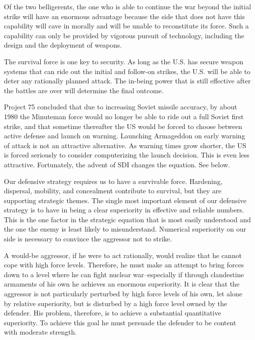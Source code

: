 Of the two belligerents, the one who is able to continue the war beyond the initial strike will have an enormous advantage because the side that does not have this capability will cave in morally and will be unable to reconstitute its force. Such a capability can only be provided by vigorous pursuit of technology, including the design and the deployment of weapons.

The survival force is one key to security. As long as the U.S. has secure weapon systems that can ride out the initial and follow-on strikes, the U.S. will be able to deter any rationally planned attack. The in-being power that is still effective after the battles are over will determine the final outcome.

\begin{mdframed}[backgroundcolor=black!10]
Project 75 concluded that due to increasing Soviet missile accuracy, by about 1980 the Minuteman force would no longer be able to ride out a full Soviet first strike, and that sometime thereafter the US would be forced to choose between active defense and launch on warning. Launching Armageddon on early warning of attack is not an attractive alternative. As warning times grow shorter, the US is forced seriously to consider computerizing the launch decision. This is even less attractive. Fortunately, the advent of SDI changes the equation. See below.
\end{mdframed}

Our defensive strategy requires us to have a survivable force. Hardening, dispersal, mobility, and concealment contribute to survival, but they are supporting strategic themes. The single most important element of our defensive strategy is to have in being a clear superiority in effective and reliable numbers. This is the one factor in the strategic equation that is most easily understood and the one the enemy is least likely to misunderstand. Numerical superiority on our side is necessary to convince the aggressor not to strike.

A would-be aggressor, if he were to act rationally, would realize that he cannot cope with high force levels. Therefore, he must make an attempt to bring forces down to a level where he can fight nuclear war--especially if through clandestine armaments of his own he achieves an enormous superiority. It is clear that the aggressor is not particularly perturbed by high force levels of his own, let alone by relative superiority, but is disturbed by a high force level owned by the defender. His problem, therefore, is to achieve a substantial quantitative superiority. To achieve this goal he must persuade the defender to be content with moderate strength.

